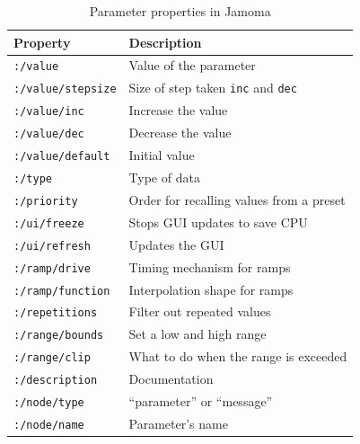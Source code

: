 \documentclass{article}
\begin{document}
\begin{table}
\begin{center}
\footnotesize\noindent
\begin{tabular}{| l | p{4.5cm} |}
    \hline
    \textbf{Property}          & \textbf{Description}\\ 
	\hline
	\texttt{:/value}			& Value of the parameter \\
	\hline
	\texttt{:/value/stepsize}	& Size of step taken \texttt{inc} and \texttt{dec} \\
	\hline
	\texttt{:/value/inc}		& Increase the value \\
	\hline
	\texttt{:/value/dec}		& Decrease the value \\
	\hline
	\texttt{:/value/default}	& Initial value \\
	\hline
	\texttt{:/type} 			& Type of data \\
	\hline
	\texttt{:/priority} 		& Order for recalling values from a preset \\
	\hline
	\texttt{:/ui/freeze} 		& Stops GUI updates to save CPU \\
	\hline
	\texttt{:/ui/refresh} 		& Updates the GUI \\
	\hline
	\texttt{:/ramp/drive} 		& Timing mechanism for ramps \\
	\hline
	\texttt{:/ramp/function} 	& Interpolation shape for ramps \\
	\hline
	\texttt{:/repetitions} 		& Filter out repeated values \\
	\hline
	\texttt{:/range/bounds} 	& Set a low and high range \\
	\hline
	\texttt{:/range/clip} 		& What to do when the range is exceeded \\
	\hline
	\texttt{:/description} 		& Documentation \\
	\hline
	\texttt{:/node/type} 		& ``parameter'' or ``message'' \\
	\hline
	\texttt{:/node/name} 		& Parameter's name \\
	\hline
\end{tabular}
\end{center}
\caption{Parameter properties in Jamoma}
\label{tab:parameter_properties}
\end{table}
\end{document}
